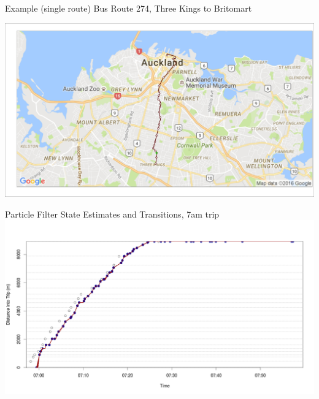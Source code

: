 \documentclass[10pt,t]{beamer}
\begin{document}
\begin{frame}{Example (single route)}
  Bus Route 274, Three Kings to Britomart


  \begin{overprint}
    \centering
    \includegraphics[width=1\textwidth,trim={2mm 2mm 2mm 2mm},clip]{figs/r274/TRIP5_particle_map001.png}

    \vspace{2em}
    Particle Filter State Estimates and Transitions, 7am trip
    \centering
    \includegraphics[width=1\textwidth]{figs/r274/TRIP5_distance_traveled.png}


\end{overprint}
\end{frame}
\end{document}
